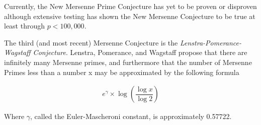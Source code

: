 Currently, the New Mersenne Prime Conjecture has yet to be proven or disproven although extensive testing
has shown the New Mersenne Conjecture to be true at least through $p < 100,000$.

The third (and most recent) Mersenne Conjecture is the \textit{Lenstra-Pomerance-Wagstaff Conjecture}. 
Lenstra, Pomerance, and Wagstaff propose that there are infinitely many Mersenne primes, and furthermore
that the number of Mersenne Primes less than a number x may be approximated by the following formula~\cite{utm.edu-heuristic}

\begin{align}
e^{\gamma} \times \log \left( \dfrac{\log{x}}{\log{2}} \right)
\end{align}

Where $\gamma$, called the Euler-Mascheroni constant, is approximately 0.57722.
